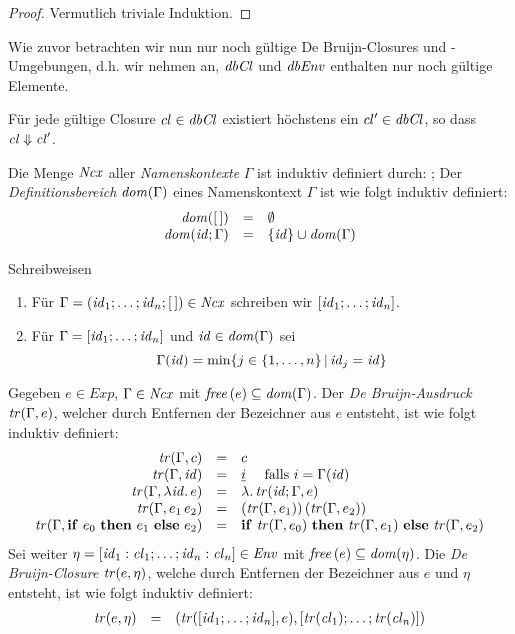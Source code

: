 \documentclass[12pt,fleqn]{article}
\newcommand{\cl}{\name{cl}}
\begin{document}
\begin{proof}
  Vermutlich triviale Induktion.
\end{proof}

Wie zuvor betrachten wir nun nur noch g\"ultige De Bruijn-Closures und -Umgebungen, d.h. wir nehmen an,
${\text{\it dbCl\/}}$ und ${\text{\it dbEnv\/}}$ enthalten nur noch g\"ultige Elemente.

\begin{lemma}
  F\"ur jede g\"ultige Closure $cl\in{\text{\it dbCl\/}}$ existiert h\"ochstens ein $cl'\in{\text{\it dbCl\/}}$, so dass
  $\cl \Downarrow \cl'$.
\end{lemma}

\begin{definition}[Namenskontext]
  Die Menge ${\text{\it Ncx\/}}$ aller {\em Namenskontexte} $\Gamma$ ist induktiv definiert durch:
  \bgram
  \Gamma \is [\,] \mid \id;\Gamma
  \egram
  Der {\em Definitionsbereich} ${\text{\it dom\/}}(\Gamma)$ eines Namenskontext $\Gamma$ ist wie folgt induktiv definiert:
  \[\begin{array}{rcl}
    {\text{\it dom\/}}([\,]) &=& \emptyset \\
    {\text{\it dom\/}}({\text{\it id\/}};\Gamma) &=& \{{\text{\it id\/}}\} \cup {\text{\it dom\/}}(\Gamma)
  \end{array}\]
\end{definition}

\noindent Schreibweisen
\begin{enumerate}
\item F\"ur $\Gamma=({\text{\it id\/}}_1;\ldots;{\text{\it id\/}}_n;[\,])\in{\text{\it Ncx\/}}$ schreiben wir $[{\text{\it id\/}}_1;\ldots;{\text{\it id\/}}_n]$.
\item F\"ur $\Gamma=[{\text{\it id\/}}_1;\ldots;{\text{\it id\/}}_n]$ und ${\text{\it id\/}}\in{\text{\it dom\/}}(\Gamma)$ sei
  \[ \Gamma({\text{\it id\/}}) = \min\{j \in \{1,\ldots,n\}\,|\, {\text{\it id\/}}_j = {\text{\it id\/}}\} \]
\end{enumerate}

\begin{definition}[\"Ubersetzungsfunktion]
  Gegeben $e \in Exp$, $\Gamma\in{\text{\it Ncx\/}}$ mit ${\text{\it free\/}}\,(e) \subseteq {\text{\it dom\/}}(\Gamma)$. Der {\em De Bruijn-Ausdruck}
  ${\text{\it tr\/}}(\Gamma,e)$, welcher durch Entfernen der Bezeichner aus $e$ entsteht, ist wie folgt induktiv definiert:
  \[\begin{array}{rcl}
    {\text{\it tr\/}}(\Gamma,c) &=& c \\
    {\text{\it tr\/}}(\Gamma,{\text{\it id\/}}) &=& \underline{i} \quad \text{ falls } i = \Gamma({\text{\it id\/}}) \\
    {\text{\it tr\/}}(\Gamma,\lambda {\text{\it id\/}}.\,e) &=& \lambda .\,{\text{\it tr\/}}({\text{\it id\/}};\Gamma,e) \\
    {\text{\it tr\/}}(\Gamma,e_1\,e_2) &=& ({\text{\it tr\/}}(\Gamma,e_1))\,({\text{\it tr\/}}(\Gamma,e_2)) \\
    {\text{\it tr\/}}(\Gamma,\mathbf{if}\ e_0\ \mathbf{then}\ e_1\ \mathbf{else}\ e_2) &=& \mathbf{if}\ {\text{\it tr\/}}(\Gamma,e_0)\ \mathbf{then}\ {\text{\it tr\/}}(\Gamma,e_1)\ \mathbf{else}\ {\text{\it tr\/}}(\Gamma,e_2)
  \end{array}\]
  Sei weiter $\eta=[\id_1:\cl_1;\ldots;\id_n:\cl_n]\in\Env$ mit ${\text{\it free\/}}\,(e)\subseteq {\text{\it dom\/}}(\eta)$. Die
  {\em De Bruijn-Closure} ${\text{\it tr\/}}(e,\eta)$, welche durch Entfernen der Bezeichner aus $e$ und $\eta$ entsteht,
  ist wie folgt induktiv definiert:
  \[\begin{array}{rcl}
    \tr{e,\eta} &=& (\tr{[\id_1;\ldots;\id_n],e},[\tr{\cl_1};\ldots;\tr{\cl_n}])
  \end{array}\]
\end{definition}
\end{document}
